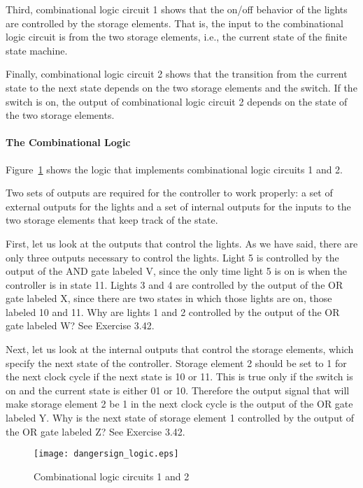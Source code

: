 \documentclass{patt}
\begin{document}
Third, combinational logic circuit 1 shows that the on/off behavior
of the lights are controlled by the storage elements. That is, the input to
the combinational logic circuit is from the two storage elements, i.e., 
the current state of the finite state machine.

Finally, combinational logic circuit 2 shows that the transition from the
current state to the next state depends on the two storage elements and the
switch.  If the switch is on, the output of combinational logic circuit 2 
depends on the state of the two storage elements.  

\paragraph{The Combinational Logic}

Figure~\ref{fig:dangersign_logic} shows the logic that
implements combinational logic circuits 1 and 2.  

Two sets of outputs are required for the controller to work properly: a set 
of external outputs for the lights and a set of internal outputs for
the inputs to the two storage elements that keep track of the state.

First, let us look at the outputs that control the lights.  As we have
said, there are only three outputs necessary to control the lights.
Light 5 is controlled by the output of the AND gate labeled V, since
the only time light 5 is on is when the controller is in state 11.  
Lights 3 and 4 are controlled by the output of the OR
gate labeled X, since there are two states in which those lights are
on, those labeled 10 and 11.  Why are lights 1 and 2 controlled by the
output of the OR gate labeled W?  See Exercise 3.42. 

Next, let us look at the internal outputs that control the storage
elements, which specify the next state of the controller.  Storage element 2 
should be set to 1 for the next clock cycle if the next state is 10 or 
11.  This is true only if the switch is on and the current state is either 
01 or 10.  Therefore the output signal that will make storage element 2 
be 1 in the next clock
cycle is the output of the OR gate labeled Y. Why is the next state of
storage element 1 controlled by the output of the OR gate labeled Z?
See Exercise 3.42.

\begin{figure}
\centerline{\texttt{[image: dangersign\_logic.eps]}}
\caption{Combinational logic circuits 1 and 2}
\label{fig:dangersign_logic}
\vspace{-6pt}
\end{figure}
\end{document}
